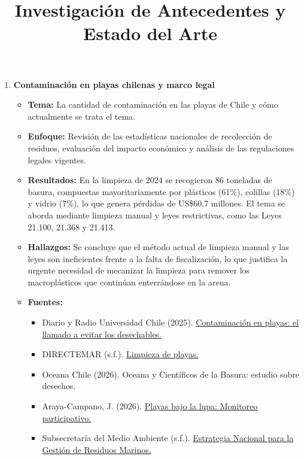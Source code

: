 \documentclass[12pt,a4paper]{article}
\title{\textbf{Investigación de Antecedentes y Estado del Arte}}
\author{}
\date{}
\begin{document}
\maketitle
\vspace{-2cm}

\begin{enumerate}[label=\textbf{\Large\arabic*.}, leftmargin=0pt, labelsep=10pt]

	\item \textbf{Contaminación en playas chilenas y marco legal}
	      \begin{itemize}[label=\textbullet]
		      \item \textbf{Tema:} La cantidad de contaminación en las playas de Chile y cómo actualmente se trata el tema.
		      \item \textbf{Enfoque:} Revisión de las estadísticas nacionales de recolección de residuos, evaluación del impacto económico y análisis de las regulaciones legales vigentes.
		      \item \textbf{Resultados:} En la limpieza de 2024 se recogieron 86 toneladas de basura, compuestas mayoritariamente por plásticos (61\%), colillas (18\%) y vidrio (7\%), lo que genera pérdidas de US\$60,7 millones. El tema se aborda mediante limpieza manual y leyes restrictivas, como las Leyes 21.100, 21.368 y 21.413.
		      \item \textbf{Hallazgos:} Se concluye que el método actual de limpieza manual y las leyes son ineficientes frente a la falta de fiscalización, lo que justifica la urgente necesidad de mecanizar la limpieza para remover los macroplásticos que continúan enterrándose en la arena.
		      \item \textbf{Fuentes:}
		            \begin{small}
			            \begin{itemize}[label=-]
				            \item Diario y Radio Universidad Chile (2025). \href{https://radio.uchile.cl/2025/02/05/contaminacion-en-playas-el-llamado-a-evitar-los-desechables-y-optar-por-la-reutilizacion/}{Contaminación en playas: el llamado a evitar los desechables.}
				            \item DIRECTEMAR (s.f.). \href{http://www.directemar.cl/directemar/intereses-maritimos/limpieza-de-playas/limpieza-de-playas}{Limpieza de playas.}
				            \item Oceana Chile (2026). Oceana y Científicos de la Basura: estudio sobre desechos.
				            \item Araya-Campano, J. (2026). \href{https://cientificosdelabasura.ucn.cl/playas-bajo-la-lupa-cientificos-de-la-basura-revelan-resultados-del-extenso-monitoreo-participativo-de-chile-y-latinoamerica/}{Playas bajo la lupa: Monitoreo participativo.}
				            \item Subsecretaría del Medio Ambiente (s.f.). \href{https://residuosmarinos.mma.gob.cl/residuos-marinos-y-microplasticos/}{Estrategia Nacional para la Gestión de Residuos Marinos.}
			            \end{itemize}
		            \end{small}
	      \end{itemize}


\end{enumerate}
\end{document}
